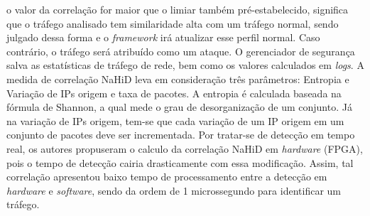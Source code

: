 o  valor da correlação for maior que o limiar também pré-estabelecido, significa que o tráfego analisado tem similaridade alta com um tráfego normal, sendo julgado dessa forma e o \textit{framework} irá atualizar esse perfil normal. Caso contrário, o tráfego será atribuído como um ataque. O gerenciador de segurança  salva as estatísticas de tráfego de rede, bem como os valores calculados em \textit{logs}. A medida de correlação NaHiD leva em consideração três parâmetros: Entropia e Variação de IPs origem e taxa de pacotes. A entropia é calculada baseada na fórmula de Shannon, a qual mede o grau de desorganização de um conjunto. Já na variação de IPs origem, tem-se que cada variação de um IP origem em um conjunto de pacotes deve ser incrementada. Por tratar-se de detecção em tempo real, os autores propuseram o calculo da correlação NaHiD em \textit{hardware} (FPGA), pois o tempo de detecção cairia drasticamente com essa modificação. Assim, tal correlação apresentou baixo tempo de processamento entre a detecção em \textit{hardware} e \textit{software}, sendo da ordem de 1 microssegundo para identificar um tráfego.  
 


   

